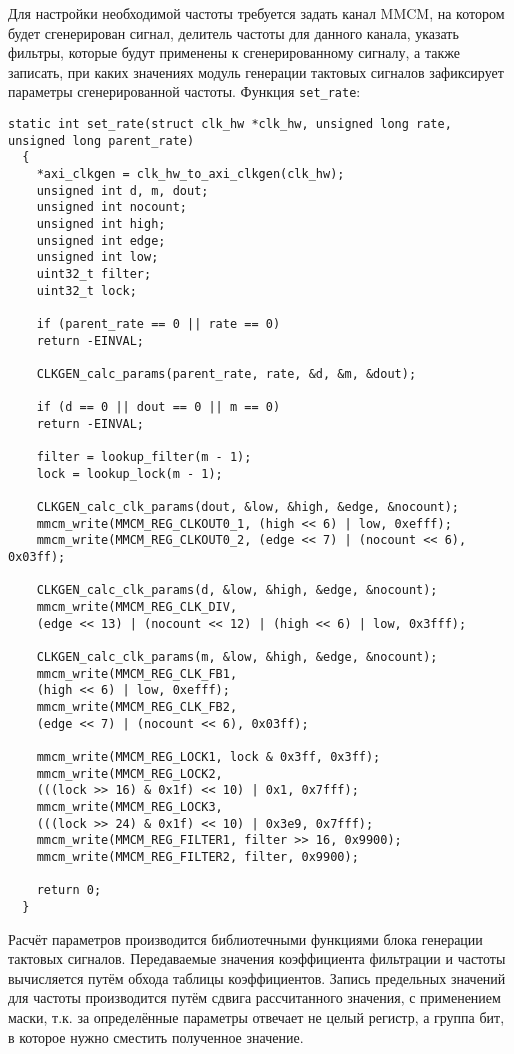 Для настройки необходимой частоты требуется задать канал MMCM, на котором
будет сгенерирован сигнал, делитель частоты для данного канала, указать
фильтры, которые будут применены к сгенерированному сигналу, а также
записать, при каких значениях модуль генерации тактовых сигналов
зафиксирует параметры сгенерированной частоты. Функция \texttt{set\_rate}:
\medskip
\begin{lstlisting}[style=C]
  static int set_rate(struct clk_hw *clk_hw, unsigned long rate, unsigned long parent_rate)
  {
    *axi_clkgen = clk_hw_to_axi_clkgen(clk_hw);
	unsigned int d, m, dout;
	unsigned int nocount;
	unsigned int high;
	unsigned int edge;
	unsigned int low;
	uint32_t filter;
	uint32_t lock;

	if (parent_rate == 0 || rate == 0)
    return -EINVAL;

	CLKGEN_calc_params(parent_rate, rate, &d, &m, &dout);

	if (d == 0 || dout == 0 || m == 0)
    return -EINVAL;

	filter = lookup_filter(m - 1);
	lock = lookup_lock(m - 1);

	CLKGEN_calc_clk_params(dout, &low, &high, &edge, &nocount);
	mmcm_write(MMCM_REG_CLKOUT0_1, (high << 6) | low, 0xefff);
	mmcm_write(MMCM_REG_CLKOUT0_2, (edge << 7) | (nocount << 6), 0x03ff);

	CLKGEN_calc_clk_params(d, &low, &high, &edge, &nocount);
	mmcm_write(MMCM_REG_CLK_DIV,
    (edge << 13) | (nocount << 12) | (high << 6) | low, 0x3fff);

	CLKGEN_calc_clk_params(m, &low, &high, &edge, &nocount);
	mmcm_write(MMCM_REG_CLK_FB1,
    (high << 6) | low, 0xefff);
	mmcm_write(MMCM_REG_CLK_FB2,
    (edge << 7) | (nocount << 6), 0x03ff);

	mmcm_write(MMCM_REG_LOCK1, lock & 0x3ff, 0x3ff);
	mmcm_write(MMCM_REG_LOCK2,
    (((lock >> 16) & 0x1f) << 10) | 0x1, 0x7fff);
	mmcm_write(MMCM_REG_LOCK3,
    (((lock >> 24) & 0x1f) << 10) | 0x3e9, 0x7fff);
	mmcm_write(MMCM_REG_FILTER1, filter >> 16, 0x9900);
	mmcm_write(MMCM_REG_FILTER2, filter, 0x9900);

	return 0;
  }
\end{lstlisting}
\medskip

Расчёт параметров производится библиотечными функциями блока генерации тактовых сигналов.
Передаваемые значения коэффициента фильтрации и частоты вычисляется путём обхода таблицы коэффициентов.
Запись предельных значений для частоты производится путём сдвига рассчитанного значения,
с применением маски, т.к. за определённые параметры отвечает не целый регистр, а группа бит,
в которое нужно сместить полученное значение.

